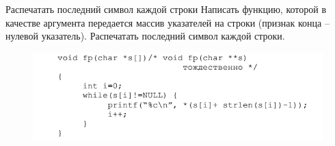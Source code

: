 \documentclass{beamer}
\begin{document}
\begin{frame}{Распечатать последний символ каждой строки}
Написать функцию, которой в качестве аргумента передается массив указателей на строки (признак конца – нулевой указатель). Распечатать последний символ каждой строки.
\begin{figure}[h]
\centering
\includegraphics[scale=0.7]{images/lec03-pic29.png}
\end{figure}
\end{frame}
\end{document}
